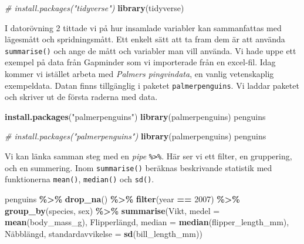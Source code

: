 \documentclass[
]{book}
\newenvironment{Shaded}{\begin{snugshade}}{\end{snugshade}}
\newcommand{\AttributeTok}[1]{\textcolor[rgb]{0.13,0.29,0.53}{#1}}
\newcommand{\CommentTok}[1]{\textcolor[rgb]{0.56,0.35,0.01}{\textit{#1}}}
\newcommand{\DecValTok}[1]{\textcolor[rgb]{0.00,0.00,0.81}{#1}}
\newcommand{\FunctionTok}[1]{\textcolor[rgb]{0.13,0.29,0.53}{\textbf{#1}}}
\newcommand{\NormalTok}[1]{#1}
\newcommand{\OtherTok}[1]{\textcolor[rgb]{0.56,0.35,0.01}{#1}}
\newcommand{\SpecialCharTok}[1]{\textcolor[rgb]{0.81,0.36,0.00}{\textbf{#1}}}
\newcommand{\StringTok}[1]{\textcolor[rgb]{0.31,0.60,0.02}{#1}}
\theoremstyle{definition}
\theoremstyle{definition}
\theoremstyle{definition}
\theoremstyle{definition}
\theoremstyle{remark}
\begin{document}
\begin{Shaded}
\begin{Highlighting}[]
\CommentTok{\# install.packages("tidyverse")}
\FunctionTok{library}\NormalTok{(tidyverse)}
\end{Highlighting}
\end{Shaded}

I datorövning 2 tittade vi på hur insamlade variabler kan sammanfattas med lägesmått och spridningsmått. Ett enkelt sätt att ta fram dem är att använda \texttt{summarise()} och ange de mått och variabler man vill använda. Vi hade uppe ett exempel på data från Gapminder som vi importerade från en excel-fil. Idag kommer vi istället arbeta med \emph{Palmers pingvindata}, en vanlig vetenskaplig exempeldata. Datan finns tillgänglig i paketet \texttt{palmerpenguins}. Vi laddar paketet och skriver ut de första raderna med data.

\begin{Shaded}
\begin{Highlighting}[]
\FunctionTok{install.packages}\NormalTok{(}\StringTok{"palmerpenguins"}\NormalTok{)}
\FunctionTok{library}\NormalTok{(palmerpenguins)}
\NormalTok{penguins}
\end{Highlighting}
\end{Shaded}

\begin{Shaded}
\begin{Highlighting}[]
\CommentTok{\# install.packages("palmerpenguins")}
\FunctionTok{library}\NormalTok{(palmerpenguins)}
\NormalTok{penguins}
\end{Highlighting}
\end{Shaded}

Vi kan länka samman steg med en \emph{pipe} \texttt{\%\textgreater{}\%}. Här ser vi ett filter, en gruppering, och en summering. Inom \texttt{summarise()} beräknas beskrivande statistik med funktionerna \texttt{mean()}, \texttt{median()} och \texttt{sd()}.

\begin{Shaded}
\begin{Highlighting}[]
\NormalTok{penguins }\SpecialCharTok{\%\textgreater{}\%} 
  \FunctionTok{drop\_na}\NormalTok{() }\SpecialCharTok{\%\textgreater{}\%} 
  \FunctionTok{filter}\NormalTok{(year }\SpecialCharTok{==} \DecValTok{2007}\NormalTok{) }\SpecialCharTok{\%\textgreater{}\%} 
  \FunctionTok{group\_by}\NormalTok{(species, sex) }\SpecialCharTok{\%\textgreater{}\%} 
  \FunctionTok{summarise}\NormalTok{(}\StringTok{\textasciigrave{}}\AttributeTok{Vikt, medel}\StringTok{\textasciigrave{}} \OtherTok{=} \FunctionTok{mean}\NormalTok{(body\_mass\_g),}
            \StringTok{\textasciigrave{}}\AttributeTok{Flipperlängd, median}\StringTok{\textasciigrave{}} \OtherTok{=} \FunctionTok{median}\NormalTok{(flipper\_length\_mm),}
            \StringTok{\textasciigrave{}}\AttributeTok{Näbblängd, standardavvikelse}\StringTok{\textasciigrave{}} \OtherTok{=} \FunctionTok{sd}\NormalTok{(bill\_length\_mm))}
\end{Highlighting}
\end{Shaded}
\end{document}
